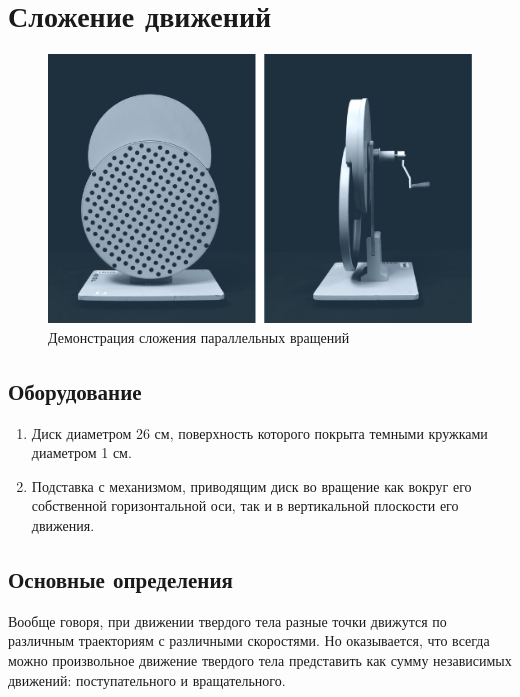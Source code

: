 \documentclass[../../../All.tex]{subfiles}
\begin{document}


		\section{Сложение движений}


\begin{figure}[H]
	\centering 	
	\includegraphics[width=0.8\linewidth]{aom-1.png}
	\caption{Демонстрация сложения параллельных вращений}
	\label{aom-1}
\end{figure}

\subsection*{\textcolor{PineGreen}{Оборудование}}

\begin{enumerate}
	\item Диск диаметром 26 см, поверхность которого покрыта темными кружками диаметром 1 см.
	\item Подставка с механизмом, приводящим диск во вращение как вокруг его собственной горизонтальной оси, так и в вертикальной плоскости его движения.
\end{enumerate}

\subsection*{\textcolor{PineGreen}{Основные определения}}

Вообще говоря, при движении твердого тела разные точки движутся по различным траекториям с различными скоростями.
Но оказывается, что всегда можно произвольное движение твердого тела представить как сумму  независимых движений: поступательного и вращательного.
\end{document}
